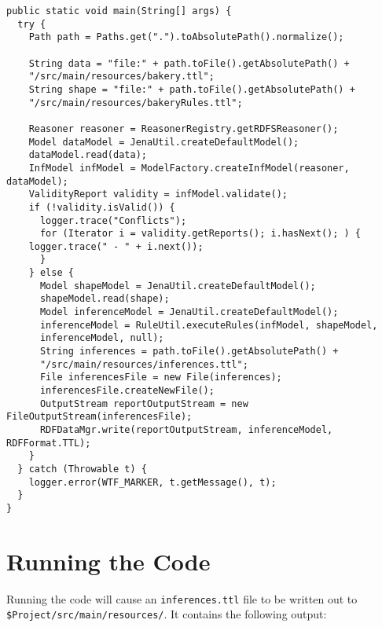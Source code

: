 \documentclass{amsart}
\begin{document}
  \begin{small}
  \begin{Verbatim} 
public static void main(String[] args) {
  try {   
    Path path = Paths.get(".").toAbsolutePath().normalize();
  
    String data = "file:" + path.toFile().getAbsolutePath() + 
	"/src/main/resources/bakery.ttl";
    String shape = "file:" + path.toFile().getAbsolutePath() + 
	"/src/main/resources/bakeryRules.ttl";
    
    Reasoner reasoner = ReasonerRegistry.getRDFSReasoner();
    Model dataModel = JenaUtil.createDefaultModel();
    dataModel.read(data);
    InfModel infModel = ModelFactory.createInfModel(reasoner, dataModel);
    ValidityReport validity = infModel.validate();
    if (!validity.isValid()) {
      logger.trace("Conflicts");
      for (Iterator i = validity.getReports(); i.hasNext(); ) {
	logger.trace(" - " + i.next());
      }        
    } else {
      Model shapeModel = JenaUtil.createDefaultModel();
      shapeModel.read(shape);
      Model inferenceModel = JenaUtil.createDefaultModel(); 
      inferenceModel = RuleUtil.executeRules(infModel, shapeModel, 
	  inferenceModel, null);        
      String inferences = path.toFile().getAbsolutePath() + 
	  "/src/main/resources/inferences.ttl";
      File inferencesFile = new File(inferences);
      inferencesFile.createNewFile();     
      OutputStream reportOutputStream = new FileOutputStream(inferencesFile);        
      RDFDataMgr.write(reportOutputStream, inferenceModel, RDFFormat.TTL);
    }
  } catch (Throwable t) {
    logger.error(WTF_MARKER, t.getMessage(), t);
  }   
}  
  \end{Verbatim}
  \end{small} 
  
  \section{Running the Code}
  Running the code will cause an \texttt{inferences.ttl} file to be written out to \\\texttt{\$Project/src/main/resources/}. It contains the following output:
  
\end{document}
